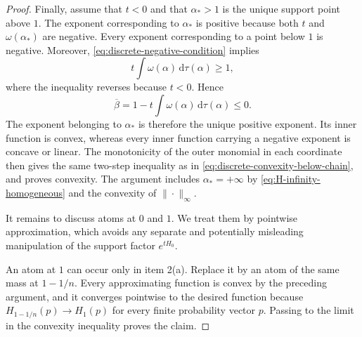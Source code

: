 \documentclass[aps,pra,11pt,onecolumn,nofootinbib,tightenlines]{revtex4-2}
\theoremstyle{definition}
\begin{document}
\begin{proof}
Finally, assume that $t<0$ and that $\alpha_*>1$ is the unique support point above $1$. The exponent corresponding to $\alpha_*$ is positive because both $t$ and $\omega(\alpha_*)$ are negative. Every exponent corresponding to a point below $1$ is negative. Moreover, \eqref{eq:discrete-negative-condition} implies
\begin{equation}
 t\int\omega(\alpha)\,\mathrm d\tau(\alpha)\geq1,
 \label{eq:negative-condition-multiplied}
\end{equation}
where the inequality reverses because $t<0$. Hence
\begin{equation}
 \overline\beta
 =1-t\int\omega(\alpha)\,\mathrm d\tau(\alpha)
 \leq0.
 \label{eq:exceptional-normalization-exponent}
\end{equation}
The exponent belonging to $\alpha_*$ is therefore the unique positive exponent. Its inner function is convex, whereas every inner function carrying a negative exponent is concave or linear. The monotonicity of the outer monomial in each coordinate then gives the same two-step inequality as in \eqref{eq:discrete-convexity-below-chain}, and proves convexity. The argument includes $\alpha_*=+\infty$ by \eqref{eq:H-infinity-homogeneous} and the convexity of $\|\cdot\|_\infty$.

It remains to discuss atoms at $0$ and $1$. We treat them by pointwise approximation, which avoids any separate and potentially misleading manipulation of the support factor $e^{tH_0}$.

An atom at $1$ can occur only in item 2(a). Replace it by an atom of the same mass at $1-1/n$. Every approximating function is convex by the preceding argument, and it converges pointwise to the desired function because $H_{1-1/n}(p)\to H_1(p)$ for every finite probability vector $p$. Passing to the limit in the convexity inequality proves the claim.


\end{proof}
\end{document}
